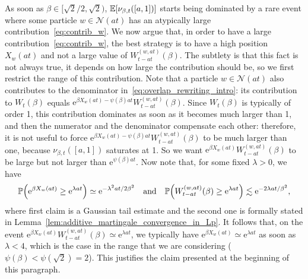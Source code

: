 \documentclass[10pt]{amsart}
\theoremstyle{definition}\newtheorem{defi}[theo]{Definition}\newtheorem{rema}[theo]{Remark}\newtheorem{exam}[theo]{Example}\newtheorem{exem}[theo]{Example}\newtheorem{nota}[theo]{Notation}
\newcommand{\e}{\mathrm{e}}
\renewcommand{\P}{\mathbb{P}}
\newcommand\1{\mathds{1}}
\newcommand{\cN}{\mathcal{N}}
\newcommand{\Expec}[1]{\mathbb{E}\left[#1\right]}
\let\originalleft\left
\let\originalright\right
\renewcommand{\left}{\mathopen{}\mathclose\bgroup\originalleft}
\renewcommand{\right}{\aftergroup\egroup\originalright}
\begin{document}
As soon as $\beta \in [\sqrt{2}/2,\sqrt{2})$, $\Expec{\nu_{\beta, t}([a, 1])}$ starts being dominated by a rare event where some particle $w\in\cN(at)$ has an atypically large contribution~\eqref{eq:contrib_w}. We now argue that, in order to have a large contribution~\eqref{eq:contrib_w}, the best strategy is to have a high position $X_w(at)$ and not a large value of $W_{t-at}^{(w,at)}(\beta)$. The subtlety is that this fact is not always true, it depends on how large the contribution should be, so we first restrict the range of this contribution. Note that a particle $w \in \cN(at)$ also contributes to the denominator in~\eqref{eq:overlap_rewriting_intro}: its contribution to $W_t(\beta)$ equals $\e^{\beta X_w(at) - \psi(\beta)at} W_{t - at}^{(w, at)}(\beta)$. Since $W_t(\beta)$ is typically of order 1, this contribution dominates as soon as it becomes much larger than 1, and then the numerator and the denominator compensate each other: therefore, it is not useful to force $\e^{\beta X_w(at) - \psi(\beta)at} W_{t - at}^{(w, at)}(\beta)$ to be much larger than one, because $\nu_{\beta, t}([a, 1])$ saturates at 1. So we want $\e^{\beta X_w(at)} W_{t-at}^{(w, at)}(\beta)$ to be large but not larger than $\e^{\psi(\beta)at}$. Now note that, for some fixed $\lambda > 0$, we have
\begin{equation*}
\P \left(\e^{\beta X_w(at)} \geq \e^{\lambda at} \right)
\simeq \e^{-\lambda^2 at/2\beta^2}
\quad \text{and}\quad
\P \left(W_{t - at}^{(w, at)}(\beta) \geq \e^{\lambda at} \right) \lesssim \e^{-2\lambda at/\beta^2},
\end{equation*}
where first claim is a Gaussian tail estimate and the second one is formally stated in Lemma~\ref{lem:additive_martingale_convergence_in_Lp}. It follows that, on the event $\e^{\beta X_w(at)} W_{t-at}^{(w, at)}(\beta) \simeq \e^{\lambda at}$, we typically have $\e^{\beta X_w(at)} \simeq \e^{\lambda at}$ as soon as $\lambda<4$, which is the case in the range that we are considering ($\psi(\beta) < \psi(\sqrt{2}) = 2$). This justifies the claim presented at the beginning of this paragraph.
\end{document}
